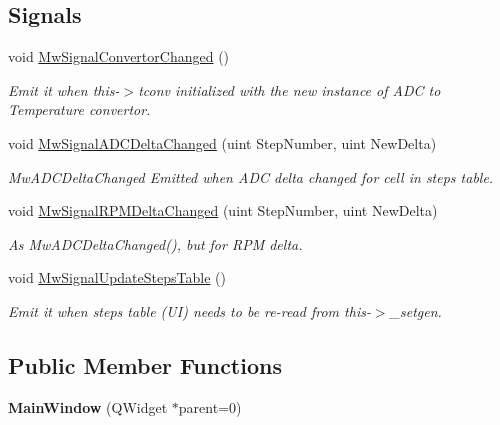 \subsection*{Signals}
\begin{DoxyCompactItemize}
\item 
\mbox{\label{class_main_window_abc97afb888a70565123689a1444ab4b9}} 
void \hyperlink{class_main_window_abc97afb888a70565123689a1444ab4b9}{Mw\+Signal\+Convertor\+Changed} ()
\begin{DoxyCompactList}\small\item\em Emit it when this-\/$>$tconv initialized with the new instance of A\+DC to Temperature convertor. \end{DoxyCompactList}\item 
void \hyperlink{class_main_window_a37ea64ccb9b5bcf9bb976602d42aadfa}{Mw\+Signal\+A\+D\+C\+Delta\+Changed} (uint Step\+Number, uint New\+Delta)
\begin{DoxyCompactList}\small\item\em Mw\+A\+D\+C\+Delta\+Changed Emitted when A\+DC delta changed for cell in steps table. \end{DoxyCompactList}\item 
void \hyperlink{class_main_window_a7b5fab96f0c2363958436141a3aae65b}{Mw\+Signal\+R\+P\+M\+Delta\+Changed} (uint Step\+Number, uint New\+Delta)
\begin{DoxyCompactList}\small\item\em As Mw\+A\+D\+C\+Delta\+Changed(), but for R\+PM delta. \end{DoxyCompactList}\item 
\mbox{\label{class_main_window_abf2e8820a7173fb2231e7f835160d8a1}} 
void \hyperlink{class_main_window_abf2e8820a7173fb2231e7f835160d8a1}{Mw\+Signal\+Update\+Steps\+Table} ()
\begin{DoxyCompactList}\small\item\em Emit it when steps table (UI) needs to be re-\/read from this-\/$>$\+\_\+setgen. \end{DoxyCompactList}\end{DoxyCompactItemize}
\subsection*{Public Member Functions}
\begin{DoxyCompactItemize}
\item 
\mbox{\label{class_main_window_a8b244be8b7b7db1b08de2a2acb9409db}} 
{\bfseries Main\+Window} (Q\+Widget $\ast$parent=0)
\end{DoxyCompactItemize}
